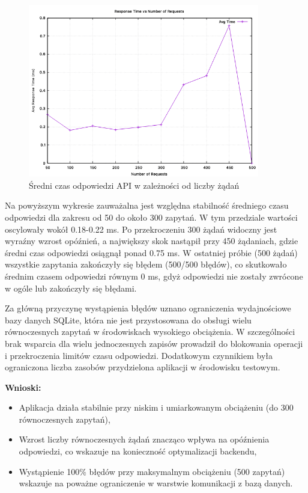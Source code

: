 \begin{figure}[H]
    \centering
    \includegraphics[width=0.9\textwidth]{chapters/assets/wykres czasu odpowiedzi.png}
    \caption{Średni czas odpowiedzi API w zależności od liczby żądań}
\end{figure}

Na powyższym wykresie zauważalna jest względna stabilność średniego czasu odpowiedzi dla zakresu od 50 do około 300 zapytań. W tym przedziale wartości oscylowały wokół 0.18-0.22 ms. Po przekroczeniu 300 żądań widoczny jest wyraźny wzrost opóźnień, a największy skok nastąpił przy 450 żądaniach, gdzie średni czas odpowiedzi osiągnął ponad 0.75 ms. W ostatniej próbie (500 żądań) wszystkie zapytania zakończyły się błędem (500/500 błędów), co skutkowało średnim czasem odpowiedzi równym 0 ms, gdyż odpowiedzi nie zostały zwrócone w ogóle lub zakończyły się błędami.

Za główną przyczynę wystąpienia błędów uznano ograniczenia wydajnościowe bazy danych SQLite, która nie jest przystosowana do obsługi wielu równoczesnych zapytań w środowiskach wysokiego obciążenia. W szczególności brak wsparcia dla wielu jednoczesnych zapisów prowadził do blokowania operacji i przekroczenia limitów czasu odpowiedzi. Dodatkowym czynnikiem była ograniczona liczba zasobów przydzielona aplikacji w środowisku testowym.

\textbf{Wnioski:}
\begin{itemize}
    \item Aplikacja działa stabilnie przy niskim i umiarkowanym obciążeniu (do 300 równoczesnych zapytań),
    \item Wzrost liczby równoczesnych żądań znacząco wpływa na opóźnienia odpowiedzi, co wskazuje na konieczność optymalizacji backendu,
    \item Wystąpienie 100\% błędów przy maksymalnym obciążeniu (500 zapytań) wskazuje na poważne ograniczenie w warstwie komunikacji z bazą danych.
\end{itemize}

